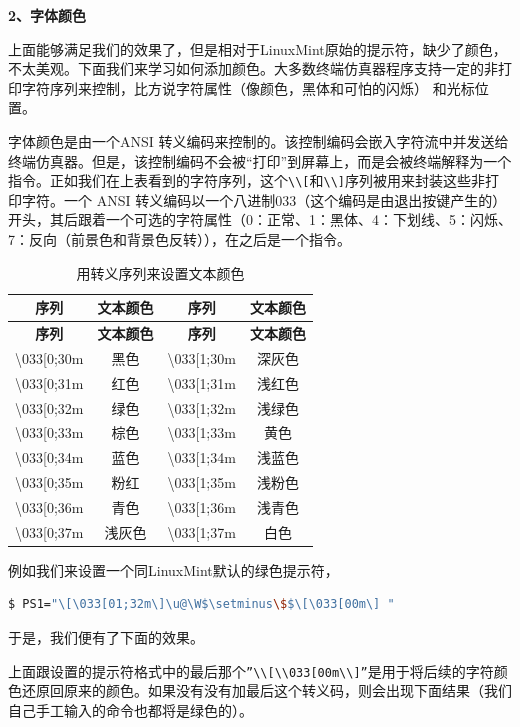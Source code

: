 \documentclass[doctor,openright,twoside]{sjtuthesis}
\newcommand{\passthrough}[1]{#1}
\theoremstyle{plain}
\theoremstyle{definition}
\theoremstyle{remark}
\theoremstyle{ocrenumbox}
\theoremstyle{plain}
\begin{document}
\textbf{2、字体颜色}

上面能够满足我们的效果了，但是相对于LinuxMint原始的提示符，缺少了颜色，不太美观。下面我们来学习如何添加颜色。大多数终端仿真器程序支持一定的非打印字符序列来控制，比方说字符属性（像颜色，黑体和可怕的闪烁） 和光标位置。

字体颜色是由一个ANSI 转义编码来控制的。该控制编码会嵌入字符流中并发送给终端仿真器。但是，该控制编码不会被``打印''到屏幕上，而是会被终端解释为一个指令。正如我们在上表看到的字符序列，这个\passthrough{\lstinline!\\[!}和\passthrough{\lstinline!\\]!}序列被用来封装这些非打印字符。一个 ANSI 转义编码以一个八进制033（这个编码是由退出按键产生的）开头，其后跟着一个可选的字符属性（0：正常、1：黑体、4：下划线、5：闪烁、7：反向（前景色和背景色反转）），在之后是一个指令。

\begin{longtable}[]{@{}cccc@{}}
\caption{用转义序列来设置文本颜色}\tabularnewline
\toprule
\textbf{序列} & \textbf{文本颜色} & \textbf{序列} & \textbf{文本颜色}\tabularnewline
\midrule
\endfirsthead
\toprule
\textbf{序列} & \textbf{文本颜色} & \textbf{序列} & \textbf{文本颜色}\tabularnewline
\midrule
\endhead
\textbackslash033{[}0;30m & 黑色 & \textbackslash033{[}1;30m & 深灰色\tabularnewline
\textbackslash033{[}0;31m & 红色 & \textbackslash033{[}1;31m & 浅红色\tabularnewline
\textbackslash033{[}0;32m & 绿色 & \textbackslash033{[}1;32m & 浅绿色\tabularnewline
\textbackslash033{[}0;33m & 棕色 & \textbackslash033{[}1;33m & 黄色\tabularnewline
\textbackslash033{[}0;34m & 蓝色 & \textbackslash033{[}1;34m & 浅蓝色\tabularnewline
\textbackslash033{[}0;35m & 粉红 & \textbackslash033{[}1;35m & 浅粉色\tabularnewline
\textbackslash033{[}0;36m & 青色 & \textbackslash033{[}1;36m & 浅青色\tabularnewline
\textbackslash033{[}0;37m & 浅灰色 & \textbackslash033{[}1;37m & 白色\tabularnewline
\bottomrule
\end{longtable}

例如我们来设置一个同LinuxMint默认的绿色提示符，

\begin{lstlisting}[language=bash]
$ PS1="\[\033[01;32m\]\u@\W$\setminus\$$\[\033[00m\] "
\end{lstlisting}

于是，我们便有了下面的效果。

上面跟设置的提示符格式中的最后那个\passthrough{\lstinline!”\\[\\033[00m\\]”!}是用于将后续的字符颜色还原回原来的颜色。如果没有没有加最后这个转义码，则会出现下面结果（我们自己手工输入的命令也都将是绿色的）。
\end{document}
